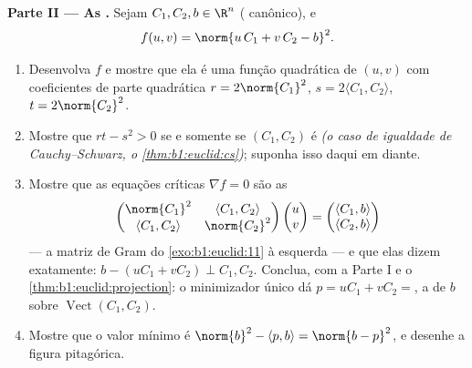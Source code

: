 \begin{problem}
\medskip
\noindent\textbf{Parte II --- As .} Sejam $C_1,
C_2, b \in \R^n$
( canônico), e
\[
f(u, v) = \norm{u\,C_1 + v\,C_2 - b}^2 .
\]
\begin{enumerate}[resume]
  \item Desenvolva $f$ e mostre que ela é uma função quadrática de
        $(u,
        v)$ com coeficientes de parte quadrática $r = 2\norm{C_1}^2$, $s = 2\langle C_1, C_2\rangle$,
        $t = 2\norm{C_2}^2$.
  \item Mostre que $rt - s^2 > 0$ se e somente se $(C_1, C_2)$ é  \emph{(o caso
        de igualdade de Cauchy--Schwarz, o \cref{thm:b1:euclid:cs})}; suponha isso
        daqui em diante.
  \item Mostre que as equações críticas $\nabla f = 0$ são as \emph{}
        \[
        \begin{pmatrix}
        \norm{C_1}^2 & \langle C_1, C_2\rangle\\
        \langle C_1, C_2\rangle & \norm{C_2}^2
        \end{pmatrix}
        \begin{pmatrix} u\\ v\end{pmatrix}
        =
        \begin{pmatrix} \langle C_1, b\rangle\\ \langle C_2,
        b\rangle\end{pmatrix}
        \]
        --- a matriz de Gram do \cref{exo:b1:euclid:11} à esquerda --- e que elas dizem
        exatamente: $b - (uC_1 + vC_2)
        \perp C_1, C_2$. Conclua, com a Parte I e o \cref{thm:b1:euclid:projection}: o
        minimizador único dá $p = uC_1 + vC_2 = $, a  de $b$ sobre
        $\operatorname{Vect}(C_1, C_2)$.
  \item Mostre que o valor mínimo é $\norm{b}^2 - \langle p,
        b\rangle = \norm{b - p}^2$, e desenhe a figura
        pitagórica.
\end{enumerate}


\end{problem}
